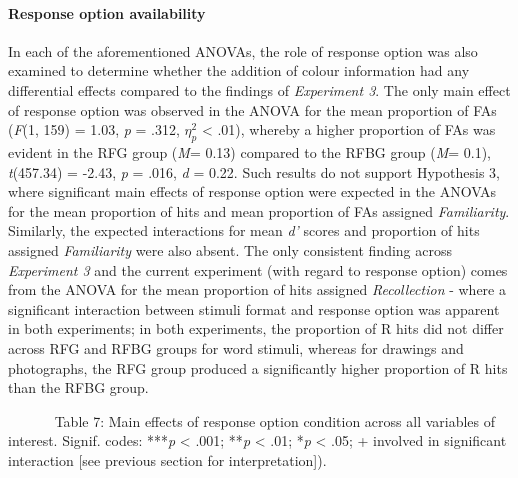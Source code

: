 \documentclass[
  11pt,
]{article}
\begin{document}
\hypertarget{response-option-availability-1}{%
\paragraph{Response option
availability}\label{response-option-availability-1}}

\hfill\break In each of the aforementioned ANOVAs, the role of response
option was also examined to determine whether the addition of colour
information had any differential effects compared to the findings of
\emph{Experiment 3}. The only main effect of response option was
observed in the ANOVA for the mean proportion of FAs (\emph{F}(1, 159) =
1.03, \emph{p} = .312, \(\eta^2_p\) \textless{} .01), whereby a higher
proportion of FAs was evident in the RFG group (\emph{M}= 0.13) compared
to the RFBG group (\emph{M}= 0.1), \emph{t}(457.34) = -2.43, \emph{p} =
.016, \emph{d} = 0.22. Such results do not support Hypothesis 3, where
significant main effects of response option were expected in the ANOVAs
for the mean proportion of hits and mean proportion of FAs assigned
\emph{Familiarity}. Similarly, the expected interactions for mean
\emph{d'} scores and proportion of hits assigned \emph{Familiarity} were
also absent. The only consistent finding across \emph{Experiment 3} and
the current experiment (with regard to response option) comes from the
ANOVA for the mean proportion of hits assigned \emph{Recollection} -
where a significant interaction between stimuli format and response
option was apparent in both experiments; in both experiments, the
proportion of R hits did not differ across RFG and RFBG groups for word
stimuli, whereas for drawings and photographs, the RFG group produced a
significantly higher proportion of R hits than the RFBG group.

~ ~ ~ ~ Table 7: Main effects of response option condition across all
variables of interest. Signif. codes: ***\emph{p} \textless{} .001;
**\emph{p} \textless{} .01; *\emph{p} \textless{} .05; + involved in
significant interaction {[}see previous section for interpretation{]}).
\end{document}
